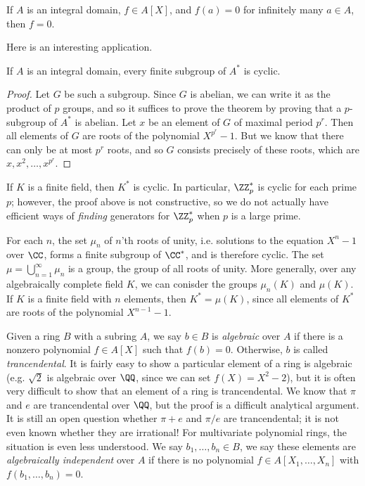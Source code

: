 \begin{corollary}
	If $A$ is an integral domain, $f \in A[X]$, and $f(a) = 0$ for infinitely many $a \in A$, then $f = 0$.
\end{corollary}

Here is an interesting application.

\begin{theorem}
	If $A$ is an integral domain, every finite subgroup of $A^*$ is cyclic.
\end{theorem}
\begin{proof}
	Let $G$ be such a subgroup. Since $G$ is abelian, we can write it as the product of $p$ groups, and so it suffices to prove the theorem by proving that a $p$-subgroup of $A^*$ is abelian. Let $x$ be an element of $G$ of maximal period $p^r$. Then all elements of $G$ are roots of the polynomial $X^{p^r} - 1$. But we know that there can only be at most $p^r$ roots, and so $G$ consists precisely of these roots, which are $x, x^2, \dots, x^{p^r}$.
\end{proof}

\begin{example}
 	If $K$ is a finite field, then $K^*$ is cyclic. In particular, $\ZZ_p^*$ is cyclic for each prime $p$; however, the proof above is not constructive, so we do not actually have efficient ways of \emph{finding} generators for $\ZZ_p^*$ when $p$ is a large prime.
 \end{example}

 \begin{example}
 	For each $n$, the set $\mu_n$ of $n$'th roots of unity, i.e. solutions to the equation $X^n - 1$ over $\CC$, forms a finite subgroup of $\CC^*$, and is therefore cyclic. The set $\mu = \bigcup_{n = 1}^\infty \mu_n$ is a group, the group of all roots of unity. More generally, over any algebraically complete field $K$, we can conisder the groups $\mu_n(K)$ and $\mu(K)$. If $K$ is a finite field with $n$ elements, then $K^* = \mu(K)$, since all elements of $K^*$ are roots of the polynomial $X^{n-1} - 1$.
 \end{example}

Given a ring $B$ with a subring $A$, we say $b \in B$ is \emph{algebraic} over $A$ if there is a nonzero polynomial $f \in A[X]$ such that $f(b) = 0$. Otherwise, $b$ is called \emph{trancendental}. It is fairly easy to show a particular element of a ring is algebraic (e.g. $\sqrt{2}$ is algebraic over $\QQ$, since we can set $f(X) = X^2 - 2$), but it is often very difficult to show that an element of a ring is trancendental. We know that $\pi$ and $e$ are trancendental over $\QQ$, but the proof is a difficult analytical argument. It is still an open question whether $\pi + e$ and $\pi/e$ are trancendental; it is not even known whether they are irrational! For multivariate polynomial rings, the situation is even less understood. We say $b_1, \dots, b_n \in B$, we say these elements are {\it algebraically independent} over $A$ if there is no polynomial $f \in A[X_1, \dots, X_n]$ with $f(b_1, \dots, b_n) = 0$.

